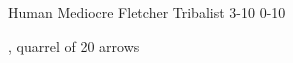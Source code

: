 
\begin{filledCS}%
  {\composeHumanName}%
  {Human}%
  {Mediocre Fletcher}%
  {Tribalist}%
  {{3}{-1}{0}}%
  {{0}{-1}{0}}%
  {%
    \setcounter{Athletics}{1}
    \setcounter{Crafts}{2}
    \setcounter{Cultivation}{1}
    \setcounter{Empathy}{1}
    \setcounter{Survival}{1}

    \setcounter{Projectiles}{1}
    \greatsword
    \partialchain
    \addtocounter{equipmentWeight}{3}
  }%
  {\guardian}%
  {\longbow, quarrel of 20 arrows}%
  \renewcommand\rank{Fodder}
  \renewcommand\characterDebt{100 \glspl{sp}}

\end{filledCS}

